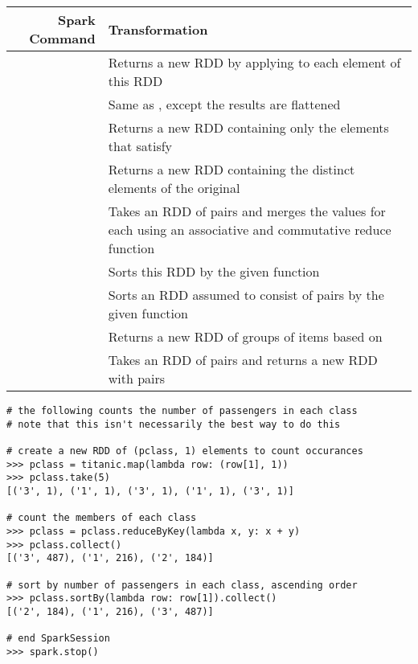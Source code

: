 \begin{table}[H]
\begin{tabular}{|r|C|}
\hline
\textbf{Spark Command} & \textbf{Transformation} \\
\hline
{} &  Returns a new RDD by applying  to each element of this RDD \\
\hline
{} & Same as , except the results are flattened \\
\hline
{} & Returns a new RDD containing only the elements that satisfy  \\
\hline
{} & Returns a new RDD containing the distinct elements of the original\\
\hline
{} & Takes an RDD of  pairs and merges the values for each  using an associative and commutative reduce function  \\
\hline
{} & Sorts this RDD by the given function  \\
\hline
{} & Sorts an RDD assumed to consist of  pairs by the given function  \\
\hline
{} & Returns a new RDD of groups of items based on  \\
\hline
{} & Takes an RDD of  pairs and returns a new RDD with  pairs \\
\hline
\end{tabular}
\end{table}


\begin{lstlisting}
# the following counts the number of passengers in each class
# note that this isn't necessarily the best way to do this

# create a new RDD of (pclass, 1) elements to count occurances
>>> pclass = titanic.map(lambda row: (row[1], 1))
>>> pclass.take(5)
[('3', 1), ('1', 1), ('3', 1), ('1', 1), ('3', 1)]

# count the members of each class
>>> pclass = pclass.reduceByKey(lambda x, y: x + y)
>>> pclass.collect()
[('3', 487), ('1', 216), ('2', 184)]

# sort by number of passengers in each class, ascending order
>>> pclass.sortBy(lambda row: row[1]).collect()
[('2', 184), ('1', 216), ('3', 487)]

# end SparkSession
>>> spark.stop()
\end{lstlisting}

